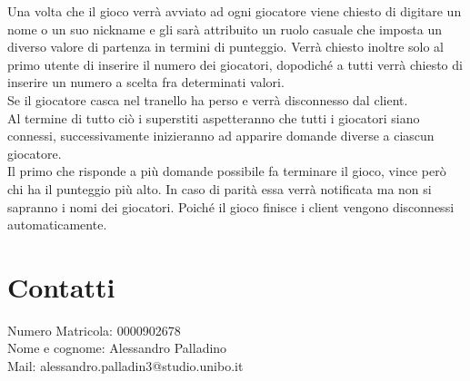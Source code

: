 \documentclass[a4paper,12pt]{report}
\begin{document}
    Una volta che il gioco verrà avviato ad ogni giocatore viene chiesto di digitare un nome o un suo nickname e gli sarà attribuito un ruolo casuale che imposta un diverso valore di partenza in termini di punteggio. 
    Verrà chiesto inoltre solo al primo utente di inserire il numero dei giocatori, dopodiché a tutti verrà chiesto di inserire un numero a scelta fra determinati valori. \\
    Se il giocatore casca nel tranello ha perso e verrà disconnesso dal client. \\
    Al termine di tutto ciò i superstiti aspetteranno che tutti i giocatori siano connessi, successivamente inizieranno ad apparire domande diverse a ciascun giocatore. \\
    Il primo che risponde a più domande possibile fa terminare il gioco, vince però chi ha il punteggio più alto. In caso di parità essa verrà notificata ma non si sapranno i nomi dei giocatori. Poiché il gioco finisce i client vengono disconnessi automaticamente.

\chapter{Contatti}
    Numero Matricola: 0000902678 \\
    Nome e cognome: Alessandro Palladino  \\
    Mail: alessandro.palladin3@studio.unibo.it \\
\end{document}
